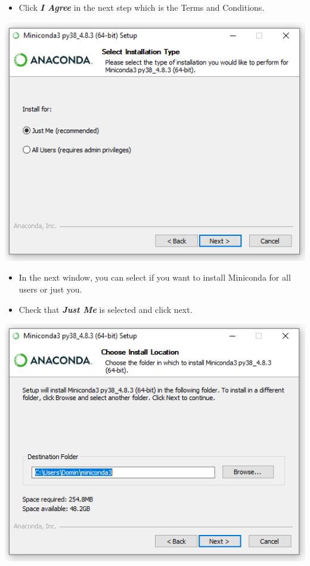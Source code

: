 \documentclass[
]{book}
\providecommand{\tightlist}{%
  \setlength{\itemsep}{0pt}\setlength{\parskip}{0pt}}
\begin{document}
\begin{itemize}
\tightlist
\item
  Click \textbf{\emph{I Agree}} in the next step which is the Terms and Conditions.
\end{itemize}

\begin{center}\includegraphics[width=7.15in]{figs/chp4/Inst_3} \end{center}

\begin{itemize}
\tightlist
\item
  In the next window, you can select if you want to install Miniconda for all users or just you.
\item
  Check that \textbf{\emph{Just Me}} is selected and click next.
\end{itemize}

\begin{center}\includegraphics[width=7.17in]{figs/chp4/Inst_4} \end{center}
\end{document}
